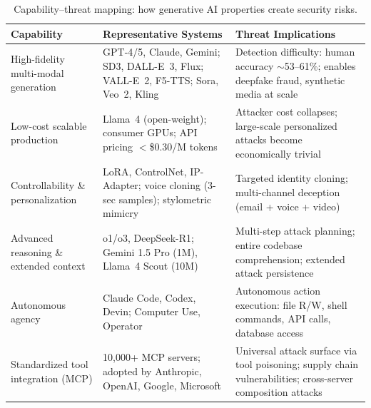 \begin{table}[htbp]
\centering
\caption{Capability--threat mapping: how generative AI properties create security risks.}
\label{tab:cap-threat}
\small
\begin{tabular}{p{3.2cm}p{4.2cm}p{5.5cm}}
\toprule
\textbf{Capability} & \textbf{Representative Systems} & \textbf{Threat Implications} \\
\midrule
High-fidelity multi-modal generation &
GPT-4/5, Claude, Gemini; SD3, DALL-E~3, Flux; VALL-E~2, F5-TTS; Sora, Veo~2, Kling &
Detection difficulty: human accuracy $\sim$53--61\%; enables deepfake fraud, synthetic media at scale \\
\addlinespace
Low-cost scalable production &
Llama~4 (open-weight); consumer GPUs; API pricing $<$\$0.30/M tokens &
Attacker cost collapses; large-scale personalized attacks become economically trivial \\
\addlinespace
Controllability \& personalization &
LoRA, ControlNet, IP-Adapter; voice cloning (3-sec samples); stylometric mimicry &
Targeted identity cloning; multi-channel deception (email + voice + video) \\
\addlinespace
Advanced reasoning \& extended context &
o1/o3, DeepSeek-R1; Gemini 1.5 Pro (1M), Llama~4 Scout (10M) &
Multi-step attack planning; entire codebase comprehension; extended attack persistence \\
\addlinespace
Autonomous agency &
Claude Code, Codex, Devin; Computer Use, Operator &
Autonomous action execution: file R/W, shell commands, API calls, database access \\
\addlinespace
Standardized tool integration (MCP) &
10,000+ MCP servers; adopted by Anthropic, OpenAI, Google, Microsoft &
Universal attack surface via tool poisoning; supply chain vulnerabilities; cross-server composition attacks \\
\bottomrule
\end{tabular}
\end{table}
